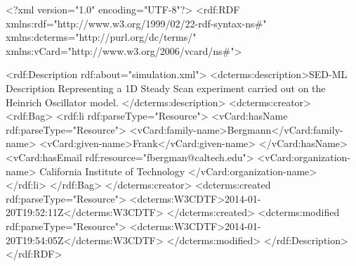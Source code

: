 \begin{example}
<?xml version="1.0" encoding="UTF-8"?>
<rdf:RDF xmlns:rdf="http://www.w3.org/1999/02/22-rdf-syntax-ns#" 
         xmlns:dcterms="http://purl.org/dc/terms/" 
				 xmlns:vCard="http://www.w3.org/2006/vcard/ns#">

   <rdf:Description rdf:about="simulation.xml">
      <dcterms:description>SED-ML Description Representing a 1D Steady Scan 
			   experiment carried out on the Heinrich Oscillator model. 
			</dcterms:description>
      <dcterms:creator>
         <rdf:Bag>
            <rdf:li rdf:parseType="Resource">
               <vCard:hasName rdf:parseType="Resource">
                  <vCard:family-name>Bergmann</vCard:family-name>
                  <vCard:given-name>Frank</vCard:given-name>
               </vCard:hasName>
               <vCard:hasEmail rdf:resource="fbergman@caltech.edu">
               <vCard:organization-name>
		      California Institute of Technology
	       </vCard:organization-name>
            </rdf:li>
         </rdf:Bag>
      </dcterms:creator>
      <dcterms:created rdf:parseType="Resource">
         <dcterms:W3CDTF>2014-01-20T19:52:11Z</dcterms:W3CDTF>
      </dcterms:created>
      <dcterms:modified rdf:parseType="Resource">
         <dcterms:W3CDTF>2014-01-20T19:54:05Z</dcterms:W3CDTF>
      </dcterms:modified>
   </rdf:Description>
</rdf:RDF>
\end{example}
